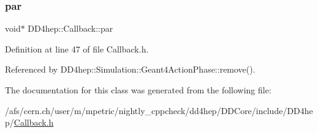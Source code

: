 \subsubsection{\texorpdfstring{par}{par}}
{\footnotesize\ttfamily void$\ast$ D\+D4hep\+::\+Callback\+::par}



Definition at line 47 of file Callback.\+h.



Referenced by D\+D4hep\+::\+Simulation\+::\+Geant4\+Action\+Phase\+::remove().



The documentation for this class was generated from the following file\+:\begin{DoxyCompactItemize}
\item 
/afs/cern.\+ch/user/m/mpetric/nightly\+\_\+cppcheck/dd4hep/\+D\+D\+Core/include/\+D\+D4hep/\hyperlink{_callback_8h}{Callback.\+h}\end{DoxyCompactItemize}
